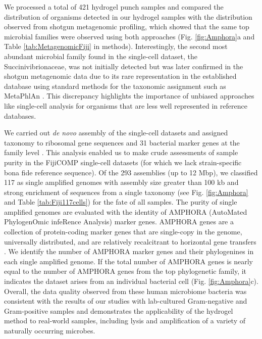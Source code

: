 We processed a total of 421 hydrogel punch samples and compared the distribution of organisms detected in our hydrogel samples with the distribution observed from shotgun metagenomic profiling, which showed that the same top microbial families were observed using both approaches (Fig. \ref{fig:Amphora}a and Table \ref{tab:MetagenomicFiji} in methods). Interestingly, the second most abundant microbial family found in the single-cell dataset, the Succinivibrionaceae, was not initially detected but was later confirmed in the shotgun metagenomic data due to its rare representation in the established database using standard methods for the taxonomic assignment such as MetaPhlAn \cite{Segata:2012ts}. This discrepancy highlights the importance of unbiased approaches like single-cell analysis for organisms that are less well represented in reference databases.

We carried out \textit{de novo} assembly of the single-cell datasets and assigned taxonomy to ribosomal gene sequences and 31  bacterial marker genes at the family level \cite{Wu:2012dh}. This analysis enabled us to make crude assessments of sample purity in the FijiCOMP single-cell datasets (for which we lack strain-specific bona fide reference sequence). Of the 293 assemblies (up to 12 Mbp), we classified 117 as single amplified genomes with assembly size greater than 100 kb and strong enrichment of sequences from a single taxonomy (see Fig. \ref{fig:Amphora} and Table \ref{tab:Fiji117cells}) for the fate of all samples. The purity of single amplified genomes are evaluated with the identity of AMPHORA (AutoMated PhylogenOmic infeRence Analysis) marker genes. AMPHORA genes are a collection of protein-coding marker genes that are single-copy in the genome, universally distributed, and are relatively recalcitrant to horizontal gene transfers \cite{Wu:2012dh}. We identify the number of AMPHORA marker genes and their phylogenines in each single amplified genome. If the total number of AMPHORA genes is nearly equal to the number of AMPHORA genes from the top phylogenetic family, it indicates the dataset arises from an individual bacterial cell (Fig. \ref{fig:Amphora}c). Overall, the data quality observed from these human microbiome bacteria was consistent with the results of our studies with lab-cultured Gram-negative and Gram-positive samples and demonstrates the applicability of the hydrogel method to real-world samples, including lysis and amplification of a variety of naturally occurring microbes.


